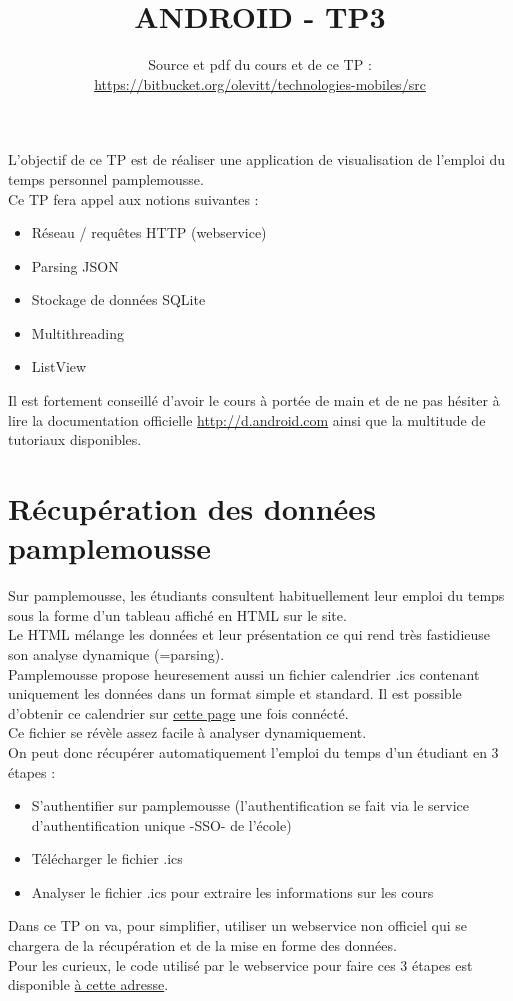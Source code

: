 \documentclass{article}
\title{ANDROID - TP3}
\date{Source et pdf du cours et de ce TP
:\\ \href{https://bitbucket.org/olevitt/technologies-mobiles}{https://bitbucket.org/olevitt/technologies-mobiles/src}}
\begin{document}
\maketitle
L'objectif de ce TP est de réaliser une application de visualisation de
l'emploi du temps personnel pamplemousse.\\
Ce TP fera appel aux notions suivantes :
\begin{itemize}
  \item Réseau / requêtes HTTP (webservice)
  \item Parsing JSON
  \item Stockage de données SQLite
  \item Multithreading
  \item ListView
\end{itemize}
Il est fortement conseillé d'avoir le cours à portée de main et de ne pas hésiter à lire la documentation officielle 
\href{http://d.android.com}{http://d.android.com} ainsi que la multitude de tutoriaux disponibles.\\
\section{Récupération des données pamplemousse}
Sur pamplemousse, les étudiants consultent habituellement leur emploi du temps
sous la forme d'un tableau affiché en HTML sur le site. \\
Le HTML mélange les données et leur présentation ce qui rend très fastidieuse
son analyse dynamique (=parsing). \\
Pamplemousse propose heuresement aussi un fichier calendrier .ics contenant
uniquement les données dans un format simple et standard. Il est possible d'obtenir ce
calendrier sur
\href{http://pamplemousse.ensai.fr/ensai/icalendar.php}{cette page} une fois
connécté.\\
Ce fichier se révèle assez facile à analyser dynamiquement.\\
On peut donc récupérer automatiquement l'emploi du temps d'un étudiant en 3
étapes :
\begin{itemize}
  \item S'authentifier sur pamplemousse (l'authentification se fait via le
  service d'authentification unique -SSO- de l'école)
  \item Télécharger le fichier .ics
  \item Analyser le fichier .ics pour extraire les informations sur les cours
\end{itemize}
Dans ce TP on va, pour simplifier, utiliser un webservice non officiel qui se
chargera de la récupération et de la mise en forme des données.\\
Pour les curieux, le code utilisé par le webservice pour faire ces 3 étapes est
disponible
\href{https://bitbucket.org/olevitt/libpamplemousse/src}{à cette adresse}.
\end{document}
